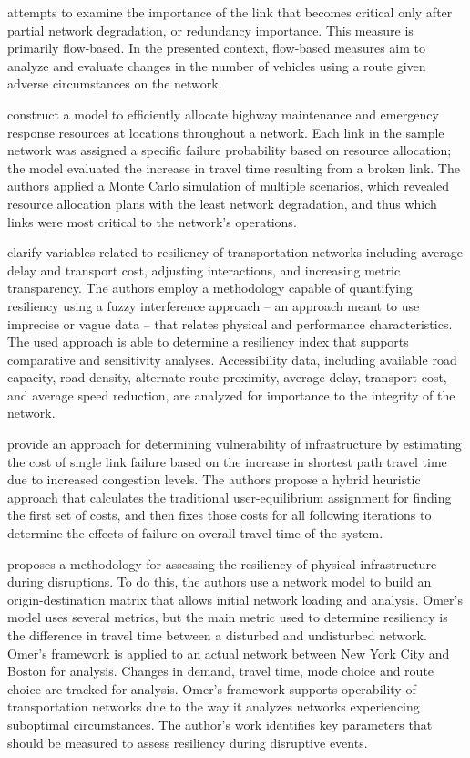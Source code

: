 \citet{Jenelius2010} attempts to examine the importance of the link that
becomes critical only after partial network degradation, or redundancy
importance. This measure is primarily flow-based. In the presented context,
flow-based measures aim to analyze and evaluate changes in the number of
vehicles using a route given adverse circumstances on the network.


\citet{peeta2010} construct a model to efficiently allocate
highway maintenance and emergency response resources at locations throughout a
network. Each link in the sample network was
assigned a specific failure probability based on resource allocation;
the model evaluated the increase in travel time resulting from a broken
link. The authors applied a Monte Carlo simulation  of multiple scenarios,
which revealed resource allocation plans with the least network degradation,
and thus which links were most critical to the network's operations.

\citet{serulle2011} clarify variables related to resiliency
of transportation networks including average delay and transport cost,
adjusting interactions,
and increasing metric transparency. The authors employ a methodology
capable of quantifying
resiliency using a fuzzy interference approach – an approach meant to use
imprecise or vague data
– that relates physical and performance characteristics. The used approach
is able to determine a
resiliency index that supports comparative and sensitivity analyses.
Accessibility data, including
available road capacity, road density, alternate route proximity, average
delay, transport cost,
and average speed reduction, are analyzed for importance to the integrity
of the network.

\citet{ibrahim2011} provide an approach for determining
vulnerability of infrastructure by estimating the cost of single link
failure based on the increase in shortest path travel time due to
increased congestion
levels. The authors propose a hybrid heuristic approach that calculates the
traditional user-equilibrium assignment for finding the first set of
costs, and
then fixes those costs for all following iterations to determine the
effects of
failure on overall travel time of the system.

\citet{omer2013} proposes a methodology for assessing the resiliency of
physical infrastructure
during disruptions. To do this, the authors use a network model to build
an origin-destination
matrix that allows initial network loading and analysis. Omer’s model uses
several metrics, but
the main metric used to determine resiliency is the difference in travel
time between a disturbed
and undisturbed network. Omer’s framework is applied to an actual network
between New York City
and Boston for analysis. Changes in demand, travel time, mode choice and
route choice are tracked
for analysis. Omer’s framework supports operability of transportation
networks due to the way it
analyzes networks experiencing suboptimal circumstances. The author's work
identifies key
parameters that should be measured to assess resiliency during disruptive
events.

